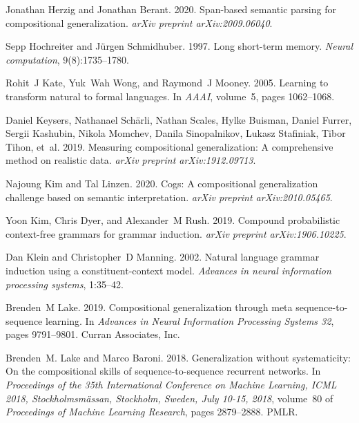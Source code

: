 \documentclass[11pt,a4paper]{article}
\begin{document}
\begin{thebibliography}{57}
Jonathan Herzig and Jonathan Berant. 2020.
\newblock Span-based semantic parsing for compositional generalization.
\newblock \emph{arXiv preprint arXiv:2009.06040}.

Sepp Hochreiter and J{\"u}rgen Schmidhuber. 1997.
\newblock Long short-term memory.
\newblock \emph{Neural computation}, 9(8):1735--1780.

Rohit~J Kate, Yuk~Wah Wong, and Raymond~J Mooney. 2005.
\newblock Learning to transform natural to formal languages.
\newblock In \emph{AAAI}, volume~5, pages 1062--1068.

Daniel Keysers, Nathanael Sch{\"a}rli, Nathan Scales, Hylke Buisman, Daniel
  Furrer, Sergii Kashubin, Nikola Momchev, Danila Sinopalnikov, Lukasz
  Stafiniak, Tibor Tihon, et~al. 2019.
\newblock Measuring compositional generalization: A comprehensive method on
  realistic data.
\newblock \emph{arXiv preprint arXiv:1912.09713}.

Najoung Kim and Tal Linzen. 2020.
\newblock Cogs: A compositional generalization challenge based on semantic
  interpretation.
\newblock \emph{arXiv preprint arXiv:2010.05465}.

Yoon Kim, Chris Dyer, and Alexander~M Rush. 2019.
\newblock Compound probabilistic context-free grammars for grammar induction.
\newblock \emph{arXiv preprint arXiv:1906.10225}.

Dan Klein and Christopher~D Manning. 2002.
\newblock Natural language grammar induction using a constituent-context model.
\newblock \emph{Advances in neural information processing systems}, 1:35--42.

Brenden~M Lake. 2019.
\newblock Compositional generalization through meta sequence-to-sequence
  learning.
\newblock In \emph{Advances in Neural Information Processing Systems 32}, pages
  9791--9801. Curran Associates, Inc.

Brenden~M. Lake and Marco Baroni. 2018.
\newblock Generalization without systematicity: On the compositional skills of
  sequence-to-sequence recurrent networks.
\newblock In \emph{Proceedings of the 35th International Conference on Machine
  Learning, {ICML} 2018, Stockholmsm{\"{a}}ssan, Stockholm, Sweden, July 10-15,
  2018}, volume~80 of \emph{Proceedings of Machine Learning Research}, pages
  2879--2888. {PMLR}.


\end{thebibliography}
\end{document}
